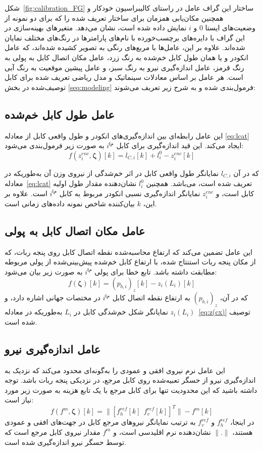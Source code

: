 شکل~\ref{fig:calibration_FG} ساختار این گراف عامل در راستای کالیبراسیون خودکار و همچنین مکان‌یابی همزمان برای ساختار تعریف شده را که برای دو نمونه از وضعیت‌های ایستا $0$ و $i$ نمایش داده شده است، نشان می‌دهد. متغیرهای بهینه‌سازی در این گراف با دایره‌های برچسب‌خورده با نام‌های پارامتر‌ها در رنگ‌های مختلف نمایان شده‌اند.
علاوه بر این، عامل‌ها با مربع‌های رنگی به تصویر کشیده شده‌اند، که عامل انکودر و یا همان طول کابل خم‌شده به رنگ زرد، عامل مکان اتصال کابل به پولی به رنگ قرمز، عامل اندازه‌گیری نیرو به رنگ سبز، و عامل پیشین موقعیت به رنگ آبی است. هر عامل بر اساس معادلات سینماتیک و مدل ریاضی تعریف شده برای کابل توصیف‌شده در بخش
\ref{seq:modeling}
 فرمول‌بندی شده و به شرح زیر تعریف می‌شوند:

\subsection{عامل طول کابل خم‌شده}
این عامل رابطه‌ای بین اندازه‌گیری‌های انکودر و طول واقعی کابل از معادله
\ref{eq:lcat}
 ایجاد می‌کند. این قید اندازه‌گیری برای کابل $i^{ام}$ به صورت زیر فرمول‌بندی می‌شود:
\begin{equation}
	f(z^{enc}_{i}, \bm{\zeta})[k] = l_{C,i}[k] + l^0_i - z^{enc}_{i}[k]
\end{equation}

که در آن $l_{C,i}$ نمایانگر طول واقعی کابل در اثر خم‌شدگی از نیروی وزن آن  به‌طوریکه در معادله~\ref{eq:lcat} تعریف شده است، می‌باشد. همچنین $l^0_i$ نشان‌دهنده مقدار طول اولیه کابل است، و $z^{enc}_{i}$ نمایانگر اندازه‌گیری نسبی انکودر مربوط به کابل $i^{ام}$ است. علاوه بر این، $k$ بیان‌کننده شاخص نمونه داده‌های زمانی است.

\subsection{عامل مکان اتصال کابل به پولی}
این عامل تضمین می‌کند که ارتفاع محاسبه‌شده نقطه اتصال کابل روی پنجه ربات، که از مکان پنجه ربات استنتاج شده، با ارتفاع کابل خم‌شده پیش‌بینی‌شده از پولی مربوطه مطابقت داشته باشد. تابع خطا برای پولی $i^{ام}$ به صورت زیر بیان می‌شود:
\begin{equation}
	f(\bm{\zeta})[k] = (p_{b,i})_z [k] - z_i(L_i)[k]
\end{equation}
که در آن، $(p_{b,i})_z$ به ارتفاع نقطه اتصال کابل $i^{ام}$ در مختصات جهانی اشاره دارد، و $z_i(L_i)$ نمایانگر شکل خم‌شدگی کابل در $L_i$ به‌طوریکه در معادله~\ref{eq:z(cx)} توصیف شده است.

\subsection{عامل اندازه‌گیری نیرو}
این عامل نرم نیروی افقی و عمودی را به‌گونه‌ای محدود می‌کند که نزدیک به اندازه‌گیری نیرو از حسگر تعبیه‌شده روی کابل مرجع، در نزدیکی پنجه ربات باشد. توجه داشته باشید که این محدودیت تنها برای کابل مرجع با یک تابع هزینه به صورت زیر مورد نیاز است:
\begin{equation}
	f(f^{m}, \bm{\zeta})[k] = \| [f^{ref}_{h}[k]~~f^{ref}_{v}[k]]^T \| - f^{m}[k]
\end{equation}
در اینجا، $f^{ref}_{h}$ و $f^{ref}_{v}$ به ترتیب نمایانگر نیروهای مرجع کابل در جهت‌های افقی و عمودی هستند، $\|.\|$ نشان‌دهنده نرم اقلیدسی است، و $f^{m}$ مقدار  نیروی کابل مرجع است که توسط حسگر نیرو اندازه‌گیری شده است.

